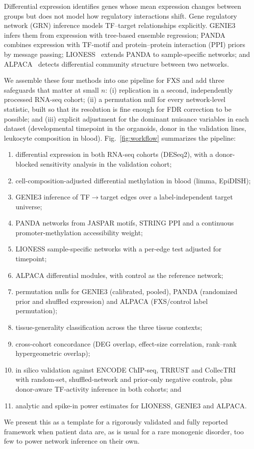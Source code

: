 \documentclass[journal]{IEEEtran}
\begin{document}
Differential expression identifies genes whose mean expression changes between groups but does not model how regulatory interactions shift. Gene regulatory network (GRN) inference models TF--target relationships explicitly. GENIE3~\cite{genie3} infers them from expression with tree-based ensemble regression; PANDA~\cite{panda} combines expression with TF-motif and protein--protein interaction (PPI) priors by message passing; LIONESS~\cite{lioness} extends PANDA to sample-specific networks; and ALPACA~\cite{alpaca} detects differential community structure between two networks.

We assemble these four methods into one pipeline for FXS and add three safeguards that matter at small $n$: (i) replication in a second, independently processed RNA-seq cohort; (ii) a permutation null for every network-level statistic, built so that its resolution is fine enough for FDR correction to be possible; and (iii) explicit adjustment for the dominant nuisance variables in each dataset (developmental timepoint in the organoids, donor in the validation lines, leukocyte composition in blood). Fig.~\ref{fig:workflow} summarizes the pipeline:
\begin{enumerate}
\item differential expression in both RNA-seq cohorts (DESeq2), with a donor-blocked sensitivity analysis in the validation cohort;
\item cell-composition-adjusted differential methylation in blood (limma, EpiDISH);
\item GENIE3 inference of TF$\rightarrow$target edges over a label-independent target universe;
\item PANDA networks from JASPAR motifs, STRING PPI and a continuous promoter-methylation accessibility weight;
\item LIONESS sample-specific networks with a per-edge test adjusted for timepoint;
\item ALPACA differential modules, with control as the reference network;
\item permutation nulls for GENIE3 (calibrated, pooled), PANDA (randomized prior and shuffled expression) and ALPACA (FXS/control label permutation);
\item tissue-generality classification across the three tissue contexts;
\item cross-cohort concordance (DEG overlap, effect-size correlation, rank--rank hypergeometric overlap);
\item in silico validation against ENCODE ChIP-seq, TRRUST and CollecTRI with random-set, shuffled-network and prior-only negative controls, plus donor-aware TF-activity inference in both cohorts; and
\item analytic and spike-in power estimates for LIONESS, GENIE3 and ALPACA.
\end{enumerate}
We present this as a template for a rigorously validated and fully reported framework when patient data are, as is usual for a rare monogenic disorder, too few to power network inference on their own.
\end{document}
